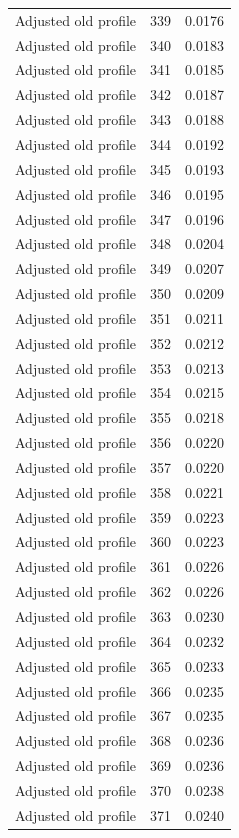 \begin{table}[htbp]
\begin{tabular}{lll}
Adjusted old profile & 339 & 0.0176 \\
Adjusted old profile & 340 & 0.0183 \\
Adjusted old profile & 341 & 0.0185 \\
Adjusted old profile & 342 & 0.0187 \\
Adjusted old profile & 343 & 0.0188 \\
Adjusted old profile & 344 & 0.0192 \\
Adjusted old profile & 345 & 0.0193 \\
Adjusted old profile & 346 & 0.0195 \\
Adjusted old profile & 347 & 0.0196 \\
Adjusted old profile & 348 & 0.0204 \\
Adjusted old profile & 349 & 0.0207 \\
Adjusted old profile & 350 & 0.0209 \\
Adjusted old profile & 351 & 0.0211 \\
Adjusted old profile & 352 & 0.0212 \\
Adjusted old profile & 353 & 0.0213 \\
Adjusted old profile & 354 & 0.0215 \\
Adjusted old profile & 355 & 0.0218 \\
Adjusted old profile & 356 & 0.0220 \\
Adjusted old profile & 357 & 0.0220 \\
Adjusted old profile & 358 & 0.0221 \\
Adjusted old profile & 359 & 0.0223 \\
Adjusted old profile & 360 & 0.0223 \\
Adjusted old profile & 361 & 0.0226 \\
Adjusted old profile & 362 & 0.0226 \\
Adjusted old profile & 363 & 0.0230 \\
Adjusted old profile & 364 & 0.0232 \\
Adjusted old profile & 365 & 0.0233 \\
Adjusted old profile & 366 & 0.0235 \\
Adjusted old profile & 367 & 0.0235 \\
Adjusted old profile & 368 & 0.0236 \\
Adjusted old profile & 369 & 0.0236 \\
Adjusted old profile & 370 & 0.0238 \\
Adjusted old profile & 371 & 0.0240 \\

\end{tabular}
\end{table}
